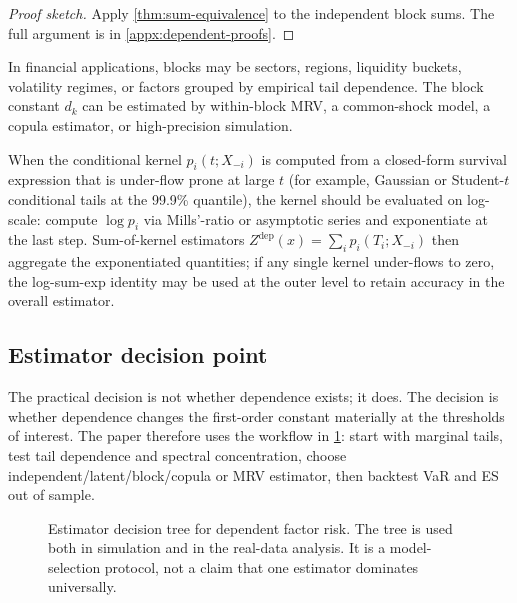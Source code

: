 \begin{proof}[Proof sketch]
Apply \cref{thm:sum-equivalence} to the independent block sums. The full
argument is in \cref{appx:dependent-proofs}.
\end{proof}

In financial applications, blocks may be sectors, regions, liquidity buckets,
volatility regimes, or factors grouped by empirical tail dependence. The block
constant \(d_k\) can be estimated by within-block MRV, a common-shock model, a
copula estimator, or high-precision simulation.

\begin{remark}
\label{rem:numerical-stability}
When the conditional kernel $p_i(t;X_{-i})$ is computed from a closed-form
survival expression that is under-flow prone at large $t$ (for example,
Gaussian or Student-$t$ conditional tails at the 99.9\% quantile), the kernel
should be evaluated on log-scale: compute $\log p_i$ via Mills'-ratio or
asymptotic series and exponentiate at the last step. Sum-of-kernel estimators
$Z^{\mathrm{dep}}(x)=\sum_i p_i(T_i;X_{-i})$ then aggregate the
exponentiated quantities; if any single kernel under-flows to zero, the
log-sum-exp identity may be used at the outer level to retain accuracy in the
overall estimator.
\end{remark}

\subsection{Estimator decision point}

The practical decision is not whether dependence exists; it does. The decision
is whether dependence changes the first-order constant materially at the
thresholds of interest. The paper therefore uses the workflow in
\cref{fig:estimator-decision-tree}: start with marginal tails, test tail
dependence and spectral concentration, choose independent/latent/block/copula
or MRV estimator, then backtest VaR and ES out of sample.

\begin{figure}[t]
\centering

\caption[Estimator decision tree]{Estimator decision tree for dependent factor
risk. The tree is used both in simulation and in the real-data analysis. It is a
model-selection protocol, not a claim that one estimator dominates universally.}
\label{fig:estimator-decision-tree}
\end{figure}

